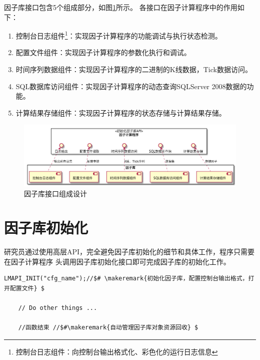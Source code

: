\large{因子库}\normalsize 接口包含5个组成部分，如图\ref{fig:s1-lmapi_component}所示。
各接口在因子计算程序中的作用如下：\\
\begin{enumerate}
\item 控制台日志组件\footnote{控制台日志组件：向控制台输出格式化、彩色化的运行日志信息}：实现因子计算程序的功能调试与执行状态检测。

\item 配置文件组件：实现因子计算程序的参数化执行和调试。

\item 时间序列数据组件：实现因子计算程序的二进制的K线数据，Tick数据访问。

\item SQL数据库访问组件：实现因子计算程序的动态查询SQLServer 2008数据的功能。

\item 计算结果存储组件：实现因子计算程序的状态存储与计算结果存储。

\end{enumerate}

\begin{figure}[htbp]
\centering
\includegraphics[width=14cm]{sprint1-lmapi_component.png}
\caption{因子库接口组成设计}
\label{fig:s1-lmapi_component}
\end{figure}

\section{因子库初始化}

研究员通过使用高层API，完全避免因子库初始化的细节和具体工作，程序只需要在因子计算程序
头调用因子库初始化接口即可完成因子库的初始化工作。\\
\begin{lstlisting}[caption=高层API接口]
    LMAPI_INIT("cfg_name");//$# \makeremark{初始化因子库，配置控制台输出格式，打开配置文件} $

    // Do other things ...

    //函数结束 //$#\makeremark{自动管理因子库对象资源回收} $
\end{lstlisting}
\showremarks


